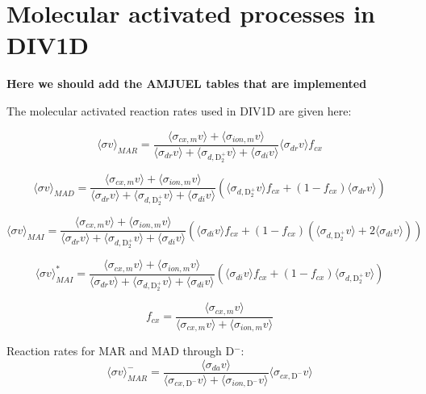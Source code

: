 \documentclass[amsmath,amssymb,a4]{revtex4-2}
\begin{document}
\section{Molecular activated processes in DIV1D}
\label{sec: MA rates}
\textbf{Here we should add the AMJUEL tables that are implemented}

The molecular activated reaction rates used in DIV1D are given here: 


\begin{equation}
    \langle\sigma v\rangle_{MAR} = \frac{\langle\sigma_{cx,m} v\rangle +  \langle\sigma_{ion,m} v\rangle}{ \langle\sigma_{dr} v\rangle +  \langle\sigma_{d,\mathrm{D}_2^+} v\rangle  +  \langle\sigma_{di} v\rangle }\langle\sigma_{dr} v\rangle f_{cx}
\end{equation}

\begin{equation}
    \langle\sigma v\rangle_{MAD} = \frac{\langle\sigma_{cx,m} v\rangle +  \langle\sigma_{ion,m} v\rangle}{ \langle\sigma_{dr} v\rangle +  \langle\sigma_{d,\mathrm{D}_2^+} v\rangle  +  \langle\sigma_{di} v\rangle }(\langle\sigma_{d,\mathrm{D}_2^+}v\rangle f_{cx} + (1-f_{cx})\langle\sigma_{dr} v\rangle)
\end{equation}

\begin{equation}
    \langle\sigma v\rangle_{MAI} = \frac{\langle\sigma_{cx,m} v\rangle +  \langle\sigma_{ion,m} v\rangle}{ \langle\sigma_{dr} v\rangle +  \langle\sigma_{d,\mathrm{D}_2^+} v\rangle  +  \langle\sigma_{di} v\rangle }(\langle\sigma_{di} v\rangle f_{cx} + (1-f_{cx})(\langle\sigma_{d,\mathrm{D}_2^+}v\rangle+ 2\langle\sigma_{di} v\rangle))
\end{equation}

\begin{equation}
    \langle\sigma v\rangle_{MAI}^* = \frac{\langle\sigma_{cx,m} v\rangle +  \langle\sigma_{ion,m} v\rangle}{ \langle\sigma_{dr} v\rangle +  \langle\sigma_{d,\mathrm{D}_2^+} v\rangle  +  \langle\sigma_{di} v\rangle }(\langle\sigma_{di} v\rangle f_{cx} + (1-f_{cx})\langle\sigma_{d,\mathrm{D}_2^+}v\rangle)
\end{equation}

\begin{equation}
    f_{cx} = \frac{\langle\sigma_{cx,m} v\rangle}{\langle\sigma_{cx,m} v\rangle + \langle\sigma_{ion,m} v\rangle}
\end{equation}

Reaction rates for MAR and MAD through D$^-$: 
\begin{equation}
    \langle\sigma v\rangle_{MAR}^- = \frac{\langle\sigma_{da} v\rangle}{  \langle \sigma_{cx,\mathrm{D}^-} v\rangle  +  \langle \sigma_{ion,\mathrm{D}^-} v\rangle}\langle \sigma_{cx,\mathrm{D}^-} v\rangle
\end{equation}
\end{document}
